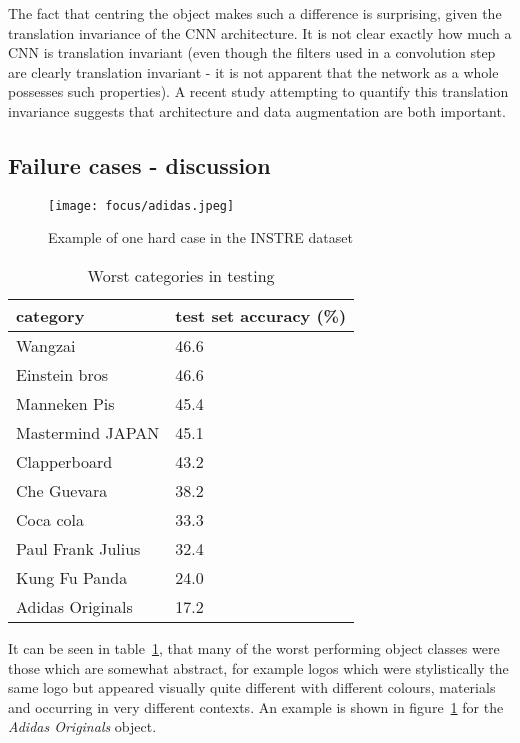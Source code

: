 The fact that centring the object makes such a difference is surprising, given the translation invariance of the CNN architecture. It is not clear exactly how much a CNN is translation invariant (even though the filters used in a convolution step are clearly translation invariant - it is not apparent that the network as a whole possesses such properties). A recent study attempting to quantify this translation invariance \cite{EricKauderer-Abrams2016} suggests that architecture and data augmentation are both important. 


\subsection {Failure cases - discussion}


\begin{figure}[t]
\centering
\texttt{[image: focus/adidas.jpeg]}
\caption{Example of one hard case in the INSTRE dataset}
\label{fig:focus_adidas}
\end{figure}



\begin{table}[h]
\centering
\caption{Worst categories in testing }
\begin{tabular}{ l l }
    category & test set accuracy (\%) \\
  \toprule 
  Wangzai & 46.6 \\
  Einstein bros & 46.6\\
  Manneken Pis & 45.4\\
  Mastermind JAPAN & 45.1\\
  Clapperboard & 43.2\\
  Che Guevara & 38.2\\
  Coca cola & 33.3\\
  Paul Frank Julius & 32.4\\
  Kung Fu Panda & 24.0\\
  Adidas Originals & 17.2\\
  \bottomrule
\end{tabular}
\label{tab:focus_failure}
\end{table}

It can be seen in table~\ref{tab:focus_failure}, that many of the worst performing object classes were those which are somewhat abstract, for example logos which were stylistically the same logo but appeared visually quite different with different colours, materials and occurring in very different contexts. An example is shown in figure~\ref{fig:focus_adidas} for the \emph{Adidas Originals} object.

